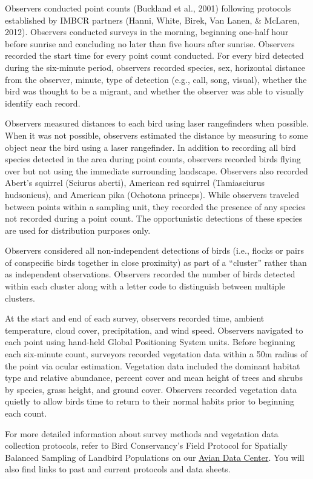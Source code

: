 \documentclass[
  letterpaper,
  DIV=11,
  numbers=noendperiod,
  oneside]{scrreprt}
\begin{document}
Observers conducted point counts (Buckland et al., 2001) following
protocols established by IMBCR partners (Hanni, White, Birek, Van Lanen,
\& McLaren, 2012). Observers conducted surveys in the morning, beginning
one-half hour before sunrise and concluding no later than five hours
after sunrise. Observers recorded the start time for every point count
conducted. For every bird detected during the six-minute period,
observers recorded species, sex, horizontal distance from the observer,
minute, type of detection (e.g., call, song, visual), whether the bird
was thought to be a migrant, and whether the observer was able to
visually identify each record.

Observers measured distances to each bird using laser rangefinders when
possible. When it was not possible, observers estimated the distance by
measuring to some object near the bird using a laser rangefinder. In
addition to recording all bird species detected in the area during point
counts, observers recorded birds flying over but not using the immediate
surrounding landscape. Observers also recorded Abert's squirrel (Sciurus
aberti), American red squirrel (Tamiasciurus hudsonicus), and American
pika (Ochotona princeps). While observers traveled between points within
a sampling unit, they recorded the presence of any species not recorded
during a point count. The opportunistic detections of these species are
used for distribution purposes only.

Observers considered all non-independent detections of birds (i.e.,
flocks or pairs of conspecific birds together in close proximity) as
part of a ``cluster'' rather than as independent observations. Observers
recorded the number of birds detected within each cluster along with a
letter code to distinguish between multiple clusters.

At the start and end of each survey, observers recorded time, ambient
temperature, cloud cover, precipitation, and wind speed. Observers
navigated to each point using hand-held Global Positioning System units.
Before beginning each six-minute count, surveyors recorded vegetation
data within a 50m radius of the point via ocular estimation. Vegetation
data included the dominant habitat type and relative abundance, percent
cover and mean height of trees and shrubs by species, grass height, and
ground cover. Observers recorded vegetation data quietly to allow birds
time to return to their normal habits prior to beginning each count.

For more detailed information about survey methods and vegetation data
collection protocols, refer to Bird Conservancy's Field Protocol for
Spatially Balanced Sampling of Landbird Populations on our
\href{http://rmbo.org/v3/avian/DataCollection.aspx}{Avian Data Center}.
You will also find links to past and current protocols and data sheets.
\end{document}
